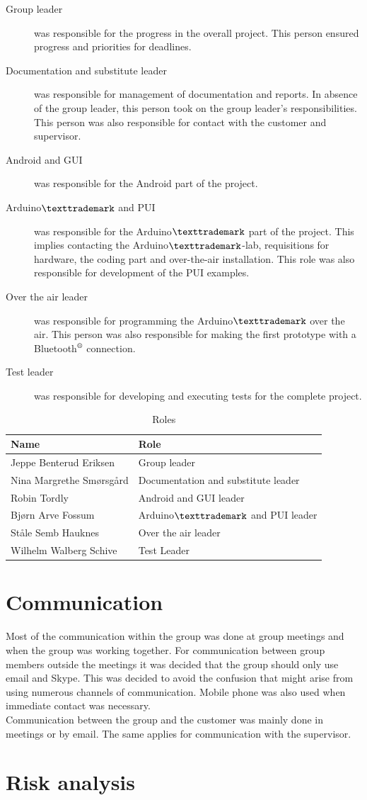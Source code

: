 \begin{description}
	\item[Group leader]{was responsible for the progress in the overall project. This person ensured progress and priorities for deadlines.}
	\item[Documentation and substitute leader]{was responsible for management of documentation and reports. In absence of the group leader, this person took on the group leader's responsibilities. This person was also responsible for contact with the customer and supervisor.}
	\item[Android and GUI]{was responsible for the Android part of the project.}
	\item[Arduino$\texttrademark$ and PUI]{was responsible for the Arduino$\texttrademark$ part of the project. This implies contacting the Arduino$\texttrademark$-lab, requisitions for hardware, the coding part and over-the-air installation. This role was also responsible for development of the PUI examples.}
	\item[Over the air leader]{was responsible for programming the Arduino$\texttrademark$ over the air. This person was also responsible for making the first prototype with a Bluetooth$\textsuperscript{\textregistered}$  connection.}
	\item[Test leader]{was responsible for developing and executing tests for the complete project.}
\end{description}

\begin{table}
\begin{tabular}{|l|l|}
\hline
	{\bf Name} & {\bf Role}\\
\hline
	Jeppe Benterud Eriksen & Group leader\\
\hline
	Nina Margrethe Smørsgård & Documentation and substitute leader\\
\hline
	Robin Tordly & Android and GUI leader\\
\hline
	Bjørn Arve Fossum & Arduino$\texttrademark$ and PUI leader\\
\hline
	Ståle Semb Hauknes & Over the air leader\\
\hline
	Wilhelm Walberg Schive & Test Leader\\
\hline
\end{tabular}
\caption{Roles}
\end{table}

\section{Communication}
Most of the communication within the group was done at group meetings and when the group was working together. For communication between group members outside the meetings it was decided that the group should only use email and Skype. This was decided to avoid the confusion that might arise from using numerous channels of communication. Mobile phone was also used when immediate contact was necessary.\\
\newline
Communication between the group and the customer was mainly done in meetings or by email. The same applies for communication with the supervisor.

\section{Risk analysis}

